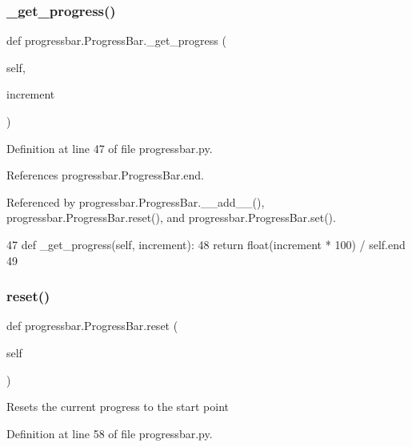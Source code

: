 \subsubsection{\texorpdfstring{\+\_\+get\+\_\+progress()}{\_get\_progress()}}
{\footnotesize\ttfamily def progressbar.\+Progress\+Bar.\+\_\+get\+\_\+progress (\begin{DoxyParamCaption}\item[{}]{self,  }\item[{}]{increment }\end{DoxyParamCaption})\hspace{0.3cm}{\ttfamily [private]}}



Definition at line 47 of file progressbar.\+py.



References progressbar.\+Progress\+Bar.\+end.



Referenced by progressbar.\+Progress\+Bar.\+\_\+\+\_\+add\+\_\+\+\_\+(), progressbar.\+Progress\+Bar.\+reset(), and progressbar.\+Progress\+Bar.\+set().


\begin{DoxyCode}
47     \textcolor{keyword}{def }\_get\_progress(self, increment):
48         \textcolor{keywordflow}{return} float(increment * 100) / self.end
49 
\end{DoxyCode}
\mbox{\label{classprogressbar_1_1ProgressBar_aefc445915e4d1eb0bbf962857c122dac}} 
\subsubsection{\texorpdfstring{reset()}{reset()}}
{\footnotesize\ttfamily def progressbar.\+Progress\+Bar.\+reset (\begin{DoxyParamCaption}\item[{}]{self }\end{DoxyParamCaption})}

\begin{DoxyVerb}Resets the current progress to the start point\end{DoxyVerb}
 

Definition at line 58 of file progressbar.\+py.



